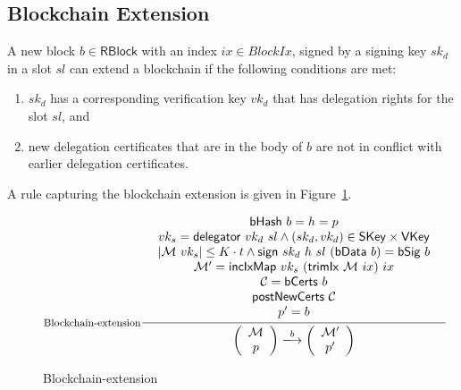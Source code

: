 \documentclass[11pt,a4paper]{article}
\newcommand{\fun}[1]{\mathsf{#1}}
\newcommand{\type}[1]{\mathsf{#1}}
\newcommand{\size}[1]{\left| #1 \right|}
\newcommand{\trans}[2]{\xlongrightarrow[\textsc{#1}]{#2}}
\newcommand{\RBlock}{\type{RBlock}}
\newcommand{\SKey}{\type{SKey}}
\newcommand{\VKey}{\type{VKey}}
\newcommand{\hashname}{bHash}
\newcommand{\signname}{sign}
\newcommand{\delegatorname}{delegator} %
\newcommand{\signmapname}{\mathcal{M}}
\newcommand{\trimixname}{trimIx}
\newcommand{\incixmapname}{incIxMap}
\newcommand{\bcertsname}{bCerts}
\newcommand{\postnewcertsname}{postNewCerts}
\newcommand{\bdataname}{bData}
\newcommand{\bsigname}{bSig}
\newcommand{\sign}[4]{\fun{\signname}\ #1 ~ #2 ~ #3 ~ #4}
\newcommand{\hash}[1]{\fun{\hashname}\ #1}
\newcommand{\delegator}[2]{\fun{\delegatorname} ~ #1 ~ #2}
\newcommand{\signmap}[1]{\fun{\signmapname} ~ #1}
\newcommand{\trimix}[2]{\fun{\trimixname} ~ #1 ~ #2}
\newcommand{\incixmap}[3]{\fun{\incixmapname} ~ #1 ~ #2 ~ #3}
\newcommand{\bcerts}[1]{\fun{\bcertsname} ~ #1}
\newcommand{\postnewcerts}[1]{\fun{\postnewcertsname} ~ #1}
\newcommand{\bdata}[1]{\fun{\bdataname} ~ #1}
\newcommand{\bsig}[1]{\fun{\bsigname} ~ #1}
\begin{document}
\subsection{Blockchain Extension}
\label{sec:chain-extension}

A new block $b \in \RBlock$ with an index $ix \in BlockIx$, signed by a
signing key $sk_d$ in a slot $sl$ can extend a blockchain if the following
conditions are met:
%
\begin{enumerate}
\item $sk_d$ has a corresponding verification key $vk_d$ that has delegation
  rights for the slot $sl$, and
\item new delegation certificates that are in the body of $b$ are not in
  conflict with earlier delegation certificates.
\end{enumerate}

A rule capturing the blockchain extension is given in
Figure~\ref{fig:blockchain-extension}.

\begin{figure}
  \begin{equation*}
  \inference[Blockchain-extension]
  {
    {\begin{array}{c}
      \hash{b} = h = p \\ %
      vk_s = \delegator{vk_d}{sl} \wedge (sk_d, vk_d) \in \SKey \times \VKey \\
      \size{\signmap{vk_s}} \leq K \cdot t \wedge \sign{sk_d}{h}{sl}{(\bdata{b})} = \bsig{b} \\
      \signmapname' = \incixmap{vk_s}{(\trimix{\signmapname}{ix})}{ix} \\
      \mathcal{C} = \bcerts{b} \\
      \postnewcerts{\mathcal{C}} \\
      p' = b 
    \end{array}}
  }
  {
    \left(
      {\begin{array}{c}
         \signmapname \\
         p
       \end{array}}
    \right)
    \trans{}{b}
    \left(
      {\begin{array}{c}
         \signmapname' \\
         p'
       \end{array}}
    \right)
 }
  \end{equation*}
  \caption{Blockchain-extension}
  \label{fig:blockchain-extension}
\end{figure}
\end{document}
